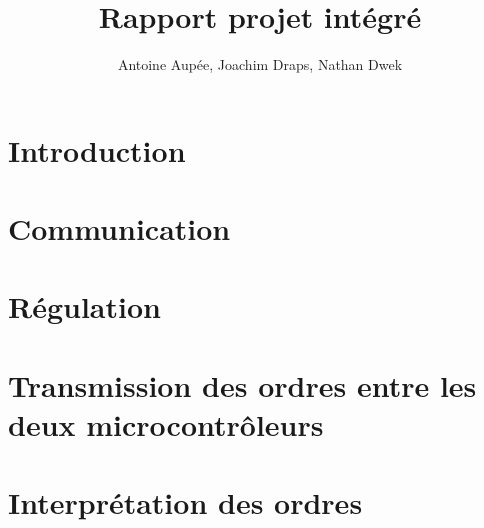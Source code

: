 \documentclass[a4paper, 11pt, frenchb]{report}
\title{Rapport projet intégré}
\author{Antoine Aupée, Joachim Draps, Nathan Dwek}
\begin{document}

\setcounter{page}{2}
\tableofcontents

\chapter{Introduction}


\chapter{Communication}


\chapter{Régulation\label{chap:regul}}


\chapter{Transmission des ordres entre les deux microcontrôleurs}


\chapter{Interprétation des ordres}


\listoffigures
\setcounter{page}{1}

\listoflistings
{}
\end{document}

